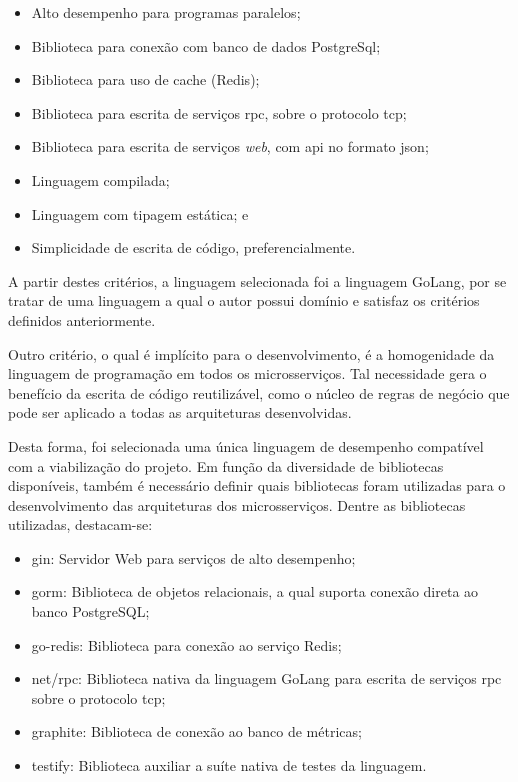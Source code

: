 \begin{itemize}
  \item Alto desempenho para programas paralelos;
  \item Biblioteca para conexão com banco de dados PostgreSql;
  \item Biblioteca para uso de cache (Redis);
  \item Biblioteca para escrita de serviços \ac{rpc}, sobre o protocolo \ac{tcp};
  \item Biblioteca para escrita de serviços \textit{web}, com \ac{api} no formato \ac{json};
  \item Linguagem compilada;
  \item Linguagem com tipagem estática; e
  \item Simplicidade de escrita de código, preferencialmente.
\end{itemize}



A partir destes critérios, a linguagem selecionada foi a linguagem GoLang, por se tratar de uma linguagem a qual o autor possui domínio e satisfaz os critérios definidos anteriormente.



Outro critério, o qual é implícito para o desenvolvimento, é a homogenidade da linguagem de programação em todos os microsserviços.
%
Tal necessidade gera o benefício da escrita de código reutilizável, como o núcleo de regras de negócio que pode ser aplicado a todas as arquiteturas desenvolvidas.



Desta forma, foi selecionada uma única linguagem de desempenho compatível com a viabilização do projeto.
%
Em função da diversidade de bibliotecas disponíveis, também é necessário definir quais bibliotecas foram utilizadas para o desenvolvimento das arquiteturas dos microsserviços.
%
Dentre as bibliotecas utilizadas, destacam-se:



\begin{itemize}
  \item gin: Servidor Web para serviços de alto desempenho;
  \item gorm: Biblioteca de objetos relacionais, a qual suporta conexão direta ao banco PostgreSQL;
  \item go-redis: Biblioteca para conexão ao serviço Redis;
  \item net/rpc: Biblioteca nativa da linguagem GoLang para escrita de serviços \ac{rpc} sobre o protocolo \ac{tcp};
  \item graphite: Biblioteca de conexão ao banco de métricas;
  \item testify: Biblioteca auxiliar a suíte nativa de testes da linguagem.
\end{itemize}



